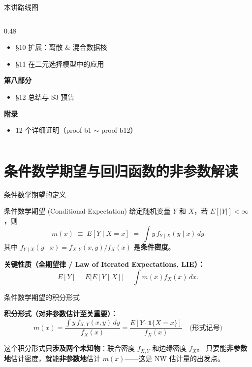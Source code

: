 \documentclass[aspectratio=169, 10pt]{beamer}
\begin{document}
\begin{frame}{本讲路线图}
\begin{columns}[T]
\begin{column}{0.48\textwidth}
\begin{itemize}
        \item §10 扩展：离散 \& 混合数据核
        \item §11 在二元选择模型中的应用
      \end{itemize}
      \textbf{第八部分}
      \begin{itemize}\footnotesize
        \item §12 总结与 S3 预告
      \end{itemize}
      \textbf{附录}
      \begin{itemize}\footnotesize
        \item 12 个详细证明（proof-b1 $\sim$ proof-b12）
      \end{itemize}
    \end{column}
  \end{columns}

\end{frame}


\section{条件数学期望与回归函数的非参数解读}

\begin{frame}{条件数学期望的定义}

  \begin{definitionbox}{条件数学期望 (Conditional Expectation)}
    给定随机变量 $Y$ 和 $X$，若 $E[|Y|]<\infty$，则
    \[
      m(x) \;\equiv\; E[Y\mid X=x] \;=\; \int y\, f_{Y\mid X}(y\mid x)\, dy
    \]
    其中 $f_{Y\mid X}(y\mid x) = f_{X,Y}(x,y)/f_X(x)$ 是\textbf{条件密度}。
  \end{definitionbox}

  \textbf{关键性质（全期望律 / Law of Iterated Expectations, LIE）：}
  \[
    E[Y] = E\bigl[E[Y\mid X]\bigr] = \int m(x) f_X(x)\, dx.
  \]

\end{frame}


\begin{frame}{条件数学期望的积分形式}

  \textbf{积分形式（对非参数估计至关重要）：}
  \[
    m(x) = \frac{\int y\, f_{X,Y}(x,y)\, dy}{f_X(x)}
         = \frac{E[Y\cdot \mathds{1}\{X=x\}]}{f_X(x)} \quad\text{(形式记号)}
  \]

  \begin{keybox}
    这个积分形式\textbf{只涉及两个未知物}：联合密度 $f_{X,Y}$ 和边缘密度 $f_X$。
    只要能\textbf{非参数地}估计密度，就能\textbf{非参数地}估计 $m(x)$——这是 NW 估计量的出发点。
  \end{keybox}

\end{frame}
\end{document}
